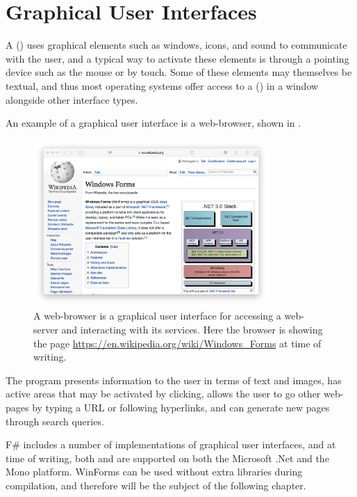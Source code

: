 \documentclass[fsharpNotes.tex]{subfiles}
\begin{document}
\chapter{Graphical User Interfaces}
\label{chap:windows}

A  () uses graphical elements such as windows, icons, and sound to communicate with the user, and a typical way to activate these elements is through a pointing device such as the mouse or by touch. Some of these elements may themselves be textual, and thus most operating systems offer access to a  () in a window alongside other interface types.

An example of a graphical user interface is a web-browser, shown in .
\begin{figure}
  \centering
  \includegraphics[width=0.8\textwidth]{safariWinForms}
  \caption{A web-browser is a graphical user interface for accessing a web-server and interacting with its services. Here the browser is showing the page \url{https://en.wikipedia.org/wiki/Windows_Forms} at time of writing.}
  \label{fig:safariGui}
\end{figure}
The program presents information to the user in terms of text and images, has active areas that may be activated by clicking, allows the user to go other web-pages by typing a URL or following hyperlinks, and can generate new pages through search queries.

F\# includes a number of implementations of graphical user interfaces, and at time of writing, both  and  are supported on both the Microsoft .Net and the Mono platform. WinForms can be used without extra libraries during compilation, and therefore will be the subject of the following chapter.
\end{document}
